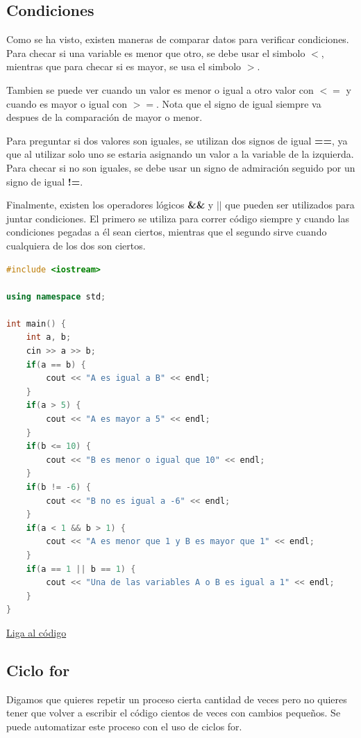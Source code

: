 \documentclass{article}
\begin{document}
\subsection{Condiciones}

Como se ha visto, existen maneras de comparar datos para verificar condiciones. Para checar si una variable es menor que otro, se debe usar el simbolo \textbf{$<$}, mientras que para checar si es mayor, se usa el simbolo \textbf{$>$}.

Tambien se puede ver cuando un valor es menor o igual a otro valor con \textbf{$<=$} y cuando es mayor o igual con \textbf{$>=$}. Nota que el signo de igual siempre va despues de la comparación de mayor o menor.

Para preguntar si dos valores son iguales, se utilizan dos signos de igual \textbf{==}, ya que al utilizar solo uno se estaria asignando un valor a la variable de la izquierda. Para checar si no son iguales, se debe usar un signo de admiración seguido por un signo de igual \textbf{!=}.

Finalmente, existen los operadores lógicos \textbf{\&\&} y \textbf{$||$} que pueden ser utilizados para juntar condiciones. El primero se utiliza para correr código siempre y cuando las condiciones pegadas a él sean ciertos, mientras que el segundo sirve cuando cualquiera de los dos son ciertos.

\begin{lstlisting}[language=C++, title=Condiciones]
#include <iostream>

using namespace std;

int main() {
	int a, b;
	cin >> a >> b;
	if(a == b) {
		cout << "A es igual a B" << endl;
	}
	if(a > 5) {
		cout << "A es mayor a 5" << endl;
	}
	if(b <= 10) {
		cout << "B es menor o igual que 10" << endl;
	}
	if(b != -6) {
		cout << "B no es igual a -6" << endl;
	}
	if(a < 1 && b > 1) {
		cout << "A es menor que 1 y B es mayor que 1" << endl;
	}
	if(a == 1 || b == 1) {
		cout << "Una de las variables A o B es igual a 1" << endl;
	}
}
\end{lstlisting}
\href{https://repl.it/@Jamesscn/Condiciones}{Liga al código}\\

\subsection{Ciclo for}

Digamos que quieres repetir un proceso cierta cantidad de veces pero no quieres tener que volver a escribir el código cientos de veces con cambios pequeños. Se puede automatizar este proceso con el uso de ciclos for.
\end{document}
